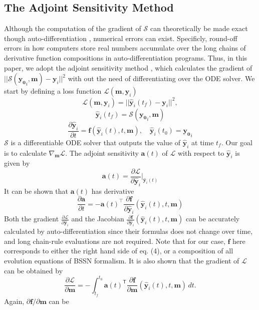 \documentclass[conference]{IEEEtran}
\begin{document}
\subsection{The Adjoint Sensitivity Method}
Although the computation of the gradient of $\mathcal{S}$ can 
theoretically be made exact though auto-differentiation \cite{torch}, 
numerical errors can exist. Specificly, round-off errors in how 
computers store real numbers accumulate over the long chains 
of derivative function compositions in auto-differentiation programs. 
Thus, in this paper, we adopt the adjoint sensitivity method \cite{NeuralODE}, 
which calculates the gradient of $|| \mathcal{S}(\mathbf{y_0}_i, \mathbf{m}) - \mathbf{y}_i||^2$
with out the need of differentiating over the ODE solver. 
We start by defining a loss function $\mathcal{L}(\mathbf{m}, \mathbf{y}_i)$
\[
\mathcal{L}(\mathbf{m}, \mathbf{y}_i) = 
|| \hat{\mathbf{y}}_i(t_f) - \mathbf{y}_i||^2,
\]
\[
\hat{\mathbf{y}}_i(t_f) = \mathcal{S}(\mathbf{y_0}_i, \mathbf{m})
\]
\[
\frac{\partial \hat{\mathbf{y}}_i}{\partial t} = \mathbf{f}(\hat{\mathbf{y}}_i(t), t, \mathbf{m}), 
\quad \hat{\mathbf{y}}_i(t_0) = \mathbf{y_0}_i
\]
$\mathcal{S} $ is a differentiable ODE solver that outputs the value 
of $\hat{\mathbf{y}}_i$ at time $t_f$. Our goal is to calculate 
$\nabla_\mathbf{m}\mathcal{L}$. The adjoint sensitivity $\mathbf{a}(t)$ of 
$\mathcal{L}$ with respect to $\hat{\mathbf{y}}_i$ is given by 
\[
\mathbf{a}(t) = \frac{\partial \mathcal{L}}{\partial \hat{\mathbf{y}}_i} \Big|_{\hat{\mathbf{y}}_i(t)}
\]
It can be shown that $\mathbf{a}(t)$ has derivative 
\[
\frac{\partial \mathbf{a}}{\partial t} = - \mathbf{a}(t)^\top \frac{\partial \mathbf{f}}{\partial \hat{\mathbf{y}}_i}(\hat{\mathbf{y}}_i(t), t, \mathbf{m}) 
\tag{15}
\]
Both the gradient $\frac{\partial \mathcal{L}}{\partial \hat{\mathbf{y}}_i}$ and 
the Jacobian $\frac{\partial \mathbf{f}}
{\partial \hat{\mathbf{y}}_i}(\hat{\mathbf{y}}_i(t), t, \mathbf{m})$ 
can be accurately calculated by auto-differentiation since their formulas
does not change over time, and long chain-rule evaluations are not required.
Note that for our case, $\mathbf{f}$ here corresponds to either the right hand side of eq. (4), 
or a composition of all evolution equations of BSSN formalism.
It is also shown that the gradient of $\mathcal{L}$ 
can be obtained by 
\[
\frac{\partial \mathcal{L}}{\partial \mathbf{m}} = - \int_{t_f}^{t_0} 
\mathbf{a}(t)^{\mathsf{T}} \frac{\partial \mathbf{f}}
{\partial \mathbf{m}}(\hat{\mathbf{y}}_i(t), t, \mathbf{m}) \, dt. 
\tag{16}
\]
Again, $\partial \mathbf{f} / \partial \mathbf{m}$ can be 
\end{document}
